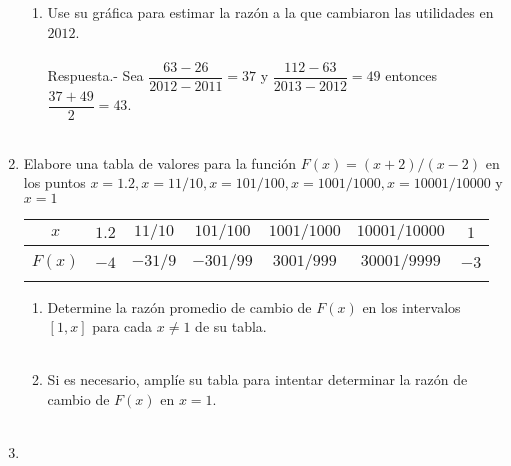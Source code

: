 \begin{enumerate}
\begin{enumerate}[\bfseries a)]
    \item Use su gráfica para estimar la razón a la que cambiaron las utilidades en $2012$.\\\\
	Respuesta.-\; Sea $\dfrac{63-26}{2012-2011} = 37$ y $\dfrac{112-63}{2013-2012} = 49$ entonces $\dfrac{37+49}{2} = 43$.\\\\

\end{enumerate}

\item Elabore una tabla de valores para la función $F(x) = (x + 2)/(x - 2)$ en los puntos $x = 1.2, x = 11/10, x = 101/100, x = 1001/1000, x = 10001/10000$ y $x = 1$\\

	\begin{center}
	\begin{tabular}{ccccccc}
	    $x$&$1.2$&$11/10$&$101/100$&$1001/1000$&$10001/10000$&$1$\\
	    \hline\\
	    $F(x)$&$-4$&$-31/9$&$-301/99$&$3001/999$&$30001/9999$&$-3$\\\\
	\end{tabular}
	\end{center}

\begin{enumerate}[\bfseries a)]
    
    \item Determine la razón promedio de cambio de $F(x)$ en los intervalos $[1, x]$ para cada $x \neq 1$ de su tabla.\\\\


    \item Si es necesario, amplíe su tabla para intentar determinar la razón de cambio de $F(x)$ en $x = 1$.\\\\

\end{enumerate}


\item 

\end{enumerate}
